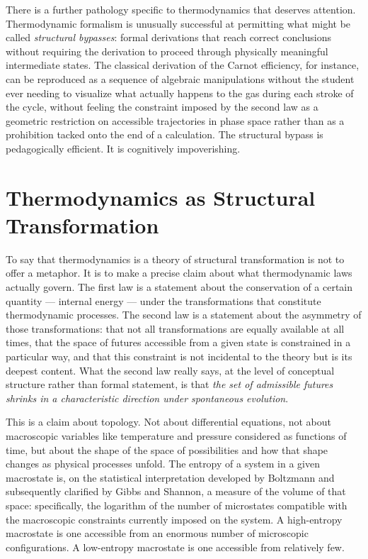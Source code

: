 \documentclass[12pt,openany]{book}
\theoremstyle{plain}
\theoremstyle{definition}
\theoremstyle{remark}
\begin{document}
There is a further pathology specific to thermodynamics that deserves attention. Thermodynamic formalism is unusually successful at permitting what might be called \emph{structural bypasses}: formal derivations that reach correct conclusions without requiring the derivation to proceed through physically meaningful intermediate states. The classical derivation of the Carnot efficiency, for instance, can be reproduced as a sequence of algebraic manipulations without the student ever needing to visualize what actually happens to the gas during each stroke of the cycle, without feeling the constraint imposed by the second law as a geometric restriction on accessible trajectories in phase space rather than as a prohibition tacked onto the end of a calculation. The structural bypass is pedagogically efficient. It is cognitively impoverishing.

\section{Thermodynamics as Structural Transformation}

To say that thermodynamics is a theory of structural transformation is not to offer a metaphor. It is to make a precise claim about what thermodynamic laws actually govern. The first law is a statement about the conservation of a certain quantity — internal energy — under the transformations that constitute thermodynamic processes. The second law is a statement about the asymmetry of those transformations: that not all transformations are equally available at all times, that the space of futures accessible from a given state is constrained in a particular way, and that this constraint is not incidental to the theory but is its deepest content. What the second law really says, at the level of conceptual structure rather than formal statement, is that \emph{the set of admissible futures shrinks in a characteristic direction under spontaneous evolution}.

This is a claim about topology. Not about differential equations, not about macroscopic variables like temperature and pressure considered as functions of time, but about the shape of the space of possibilities and how that shape changes as physical processes unfold. The entropy of a system in a given macrostate is, on the statistical interpretation developed by Boltzmann and subsequently clarified by Gibbs and Shannon, a measure of the volume of that space: specifically, the logarithm of the number of microstates compatible with the macroscopic constraints currently imposed on the system. A high-entropy macrostate is one accessible from an enormous number of microscopic configurations. A low-entropy macrostate is one accessible from relatively few.
\end{document}
